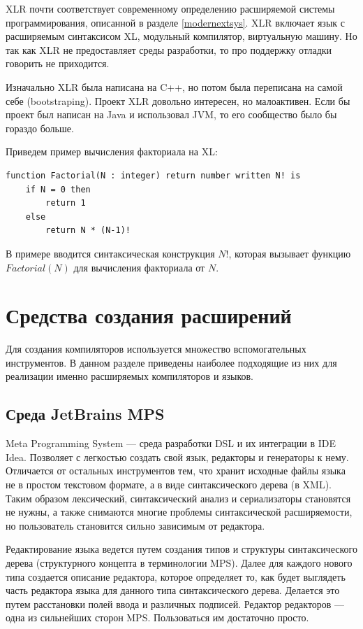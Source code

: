 \documentclass[a4paper,12pt,titlepage]{extarticle}
\begin{document}
XLR почти соответствует современному определению расширяемой системы
программирования, описанной в разделе \ref{modernextsys}. XLR включает язык с
расширяемым синтаксисом XL, модульный компилятор, виртуальную машину. Но так как
XLR не предоставляет среды разработки, то про поддержку отладки говорить не
приходится.

Изначально XLR была написана на C++, но потом была переписана на самой себе
(bootstraping).
Проект XLR довольно интересен, но малоактивен. Если бы проект был написан на
Java и использовал JVM, то его сообщество было бы гораздо больше.

Приведем пример вычисления факториала на XL:
\begin{verbatim}
function Factorial(N : integer) return number written N! is
    if N = 0 then
        return 1
    else
        return N * (N-1)!
\end{verbatim}
В примере вводится синтаксическая конструкция $N!$, которая вызывает функцию
$Factorial(N)$ для вычисления факториала от $N$.

\section{Средства создания расширений}
\label{tools}

Для создания компиляторов используется множество вспомогательных инструментов. В
данном разделе приведены наиболее подходящие из них для реализации
именно расширяемых компиляторов и языков. 

\subsection{Среда JetBrains MPS}
Meta Programming System --- среда разработки DSL и их интеграции в IDE Idea.
Позволяет с легкостью создать свой язык, редакторы и генераторы к нему.
Отличается от остальных инструментов тем, что хранит исходные файлы языка не в
простом текстовом формате, а в виде синтаксического дерева (в XML).
Таким образом лексический, синтаксический анализ и сериализаторы
становятся не нужны, а также снимаются многие проблемы синтаксической
расширяемости, но пользователь становится сильно зависимым от редактора.

Редактирование языка ведется путем создания типов и структуры синтаксического
дерева (структурного концепта в терминологии MPS). Далее для каждого нового типа
создается описание редактора, которое определяет то, как будет выглядеть часть
редактора языка для данного типа синтаксического дерева. Делается это путем
расстановки полей ввода и различных подписей. Редактор редакторов --- одна из
сильнейших сторон MPS. Пользоваться им достаточно просто.
\end{document}
